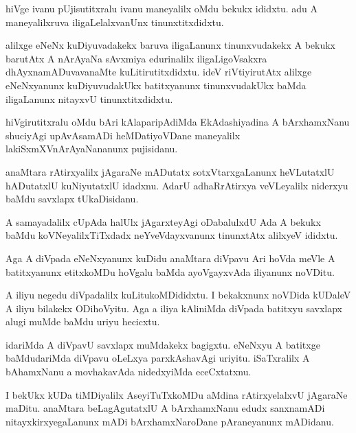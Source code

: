 \documentclass{article}
\begin{document}
\begin{mn}%
hiVge ivanu pUjisutitxralu ivanu maneyalilx oMdu bekukx ididxtu. adu A maneyalilxruva 
iligaLelalxvanUnx tinunxtitxdidxtu.
\end{mn}

\begin{mn}%
alilxge eNeNx kuDiyuvadakekx baruva iligaLanunx tinunxvudakekx A bekukx barutAtx A nArAyaNa 
sAvxmiya edurinalilx iligaLigoVsakxra dhAyxnamADuvavanaMte kuLitirutitxdidxtu. ideV riVtiyirutAtx 
alilxge eNeNxyanunx kuDiyuvudakUkx batitxyanunx tinunxvudakUkx baMda iligaLanunx nitayxvU 
tinunxtitxdidxtu.
\end{mn}

\begin{mn}%
hiVgirutitxralu oMdu bAri kAlaparipAdiMda EkAdashiyadina A bArxhamxNanu shuciyAgi upAvAsamADi 
heMDatiyoVDane maneyalilx lakiSxmXVnArAyaNananunx pujisidanu.
\end{mn}

\begin{mn}%
anaMtara rAtirxyalilx jAgaraNe mADutatx sotxVtarxgaLanunx heVLutatxlU hADutatxlU kuNiyutatxlU 
idadxnu. AdarU adhaRrAtirxya veVLeyalilx niderxyu baMdu savxlapx tUkaDisidanu.
\end{mn}

\begin{mn}%
A samayadalilx cUpAda halUlx jAgarxteyAgi oDabalulxdU Ada A bekukx baMdu koVNeyalilxTiTxdadx 
neYveVdayxvanunx tinunxtAtx alilxyeV ididxtu.
\end{mn}

\begin{mn}%
Aga A diVpada eNeNxyanunx kuDidu anaMtara diVpavu Ari hoVda meVle A batitxyanunx etitxkoMDu hoVgalu 
baMda ayoVgayxvAda iliyanunx noVDitu. 
\end{mn}

\begin{mn}%
A iliyu negedu diVpadalilx kuLitukoMDididxtu. I bekakxnunx noVDida kUDaleV A iliyu bilakekx 
ODihoVyitu. Aga a  iliya kAliniMda diVpada batitxyu savxlapx alugi muMde baMdu uriyu hecicxtu.
\end{mn}

\begin{mn}%
idariMda A diVpavU savxlapx muMdakekx bagigxtu. eNeNxyu A batitxge baMdudariMda diVpavu oLeLxya 
parxkAshavAgi uriyitu. iSaTxralilx A bAhamxNanu a movhakavAda nidedxyiMda eceCxtatxnu.
\end{mn}

\begin{mn}%
I bekUkx kUDa tiMDiyalilx AseyiTuTxkoMDu aMdina rAtirxyelalxvU jAgaraNe maDitu. anaMtara 
beLagAgutatxlU A bArxhamxNanu edudx sanxnamADi nitayxkirxyegaLanunx mADi bArxhamxNaroDane 
pAraneyanunx mADidanu.
\end{mn}
\end{document}
